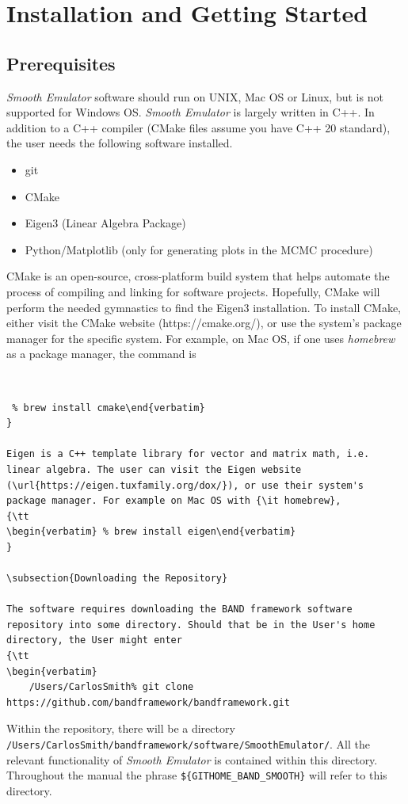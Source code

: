 \documentclass[UserManual.tex]{subfiles}
\begin{document}
\setcounter{section}{1}

\section{Installation and Getting Started}\label{sec:installation}

\subsection{Prerequisites}
{\it Smooth Emulator} software should run on UNIX, Mac OS or Linux, but is not supported for Windows OS. {\it Smooth Emulator} is largely  written in C++. In addition to a C++ compiler (CMake files assume you have C++ 20 standard), the user needs the following software installed.

\begin{itemize}
    \item git
    \item CMake
    \item Eigen3 (Linear Algebra Package)
    \item Python/Matplotlib (only for generating plots in the MCMC procedure)
\end{itemize}

CMake is an open-source, cross-platform build system that helps automate the process of compiling and linking for software projects. Hopefully, CMake will perform the needed gymnastics to find the Eigen3 installation. To install CMake, either visit the CMake website (https://cmake.org/), or use the system's package manager for the specific system. For example, on Mac OS, if one uses {\it homebrew} as a package manager, the command is
{\tt 
\begin{verbatim} % brew install cmake\end{verbatim}
}

Eigen is a C++ template library for vector and matrix math, i.e. linear algebra. The user can visit the Eigen website (\url{https://eigen.tuxfamily.org/dox/}), or use their system's package manager. For example on Mac OS with {\it homebrew},
{\tt 
\begin{verbatim} % brew install eigen\end{verbatim}
}

\subsection{Downloading the Repository}

The software requires downloading the BAND framework software repository into some directory. Should that be in the User's home directory, the User might enter
{\tt 
\begin{verbatim}
    /Users/CarlosSmith% git clone https://github.com/bandframework/bandframework.git
\end{verbatim}
}
Within the repository, there will be a directory\\{\tt /Users/CarlosSmith/bandframework/software/SmoothEmulator/}. All the relevant functionality of {\it Smooth Emulator} is contained within this directory. Throughout the manual the phrase {\tt \$\{GITHOME\_BAND\_SMOOTH\}} will refer to this directory. 
\end{document}
